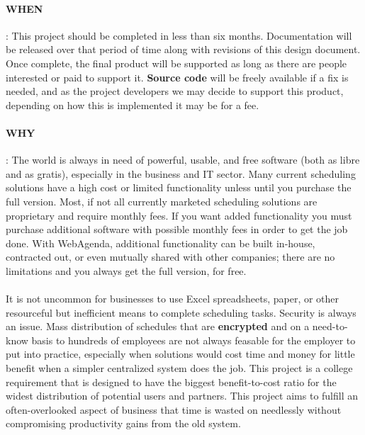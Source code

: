 \documentclass[letterpaper,12pt]{report}
\begin{document}
\paragraph{WHEN }: This project should be completed in less than six months. Documentation will be released over that period of time along with revisions of this design document. Once complete, the final product will be supported as long as there are people interested or paid to support it. \textbf{Source code} will be freely available if a fix is needed, and as the project developers we may decide to support this product, depending on how this is implemented it may be for a fee.
\paragraph{WHY  }: The world is always in need of powerful, usable, and free software (both as libre and as gratis), especially in the business and IT sector. Many current scheduling solutions have a high cost or limited functionality unless until you purchase the full version. Most, if not all currently marketed scheduling solutions are proprietary and require monthly fees. If you want added functionality you must purchase additional software with possible monthly fees in order to get the job done. With WebAgenda, additional functionality can be built in-house, contracted out, or even mutually shared with other companies; there are no limitations and you always get the full version, for free.
\paragraph*{} \hspace{1cm}It is not uncommon for businesses to use Excel spreadsheets, paper, or other resourceful but inefficient means to complete scheduling tasks. Security is always an issue. Mass distribution of schedules that are \textbf{encrypted} and on a need-to-know basis to hundreds of employees are not always feasable for the employer to put into practice, especially when solutions would cost time and money for little benefit when a simpler centralized system does the job. This project is a college requirement that is designed to have the biggest benefit-to-cost ratio for the widest distribution of potential users and partners.
\newline
\newline
\hspace*{1.3cm}This project aims to fulfill an often-overlooked aspect of business that time is wasted on needlessly without compromising productivity gains from the old system.
\pagebreak
\end{document}
